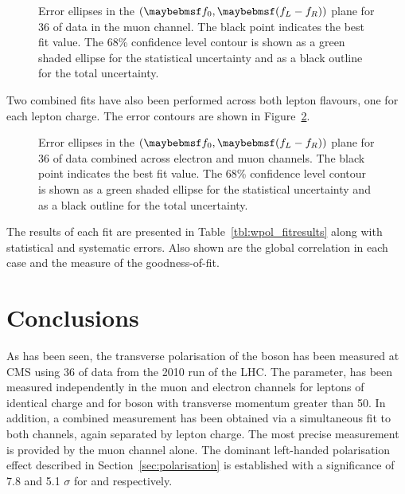 \begin{figure}
\centering
{}\quad
{}
\caption{Error ellipses in the $(\f0, \fLmfR)$ plane for \unit{36}{\invpb} of
  data in the muon channel. The black point indicates the best fit
  value. The 68\% confidence level contour is shown as a green shaded ellipse
  for the statistical uncertainty and as a black outline for the total
  uncertainty.}
\label{fig:wpol_contour_mu}
\end{figure}

Two combined fits have also been performed across both lepton flavours, one for
each lepton charge. The error contours are shown in
Figure~\ref{fig:wpol_contour_comb}.
\begin{figure}
\centering
{}\quad
{}
\caption{Error ellipses in the $(\f0, \fLmfR)$ plane for \unit{36}{\invpb} of
  data combined across electron and muon channels. The black point indicates the
  best fit value. The 68\% confidence level contour is shown as a green shaded
  ellipse for the statistical uncertainty and as a black outline for the total
  uncertainty.}
\label{fig:wpol_contour_comb}
\end{figure}

The results of each fit are presented in Table~\ref{tbl:wpol_fitresults} along
with statistical and systematic errors. Also shown are the global correlation in
each case and the \chisq measure of the goodness-of-fit.






\section{Conclusions}
As has been seen, the transverse polarisation of the \PW boson has been measured
at \ac{CMS} using \unit{36}{\invpb} of data from the 2010 run of the
\ac{LHC}. The parameter, \fLmfR has been measured independently in the muon and
electron channels for leptons of identical charge and for \PW boson with
transverse momentum greater than \unit{50}{\GeV}. In addition, a combined
measurement has been obtained via a simultaneous fit to both channels, again
separated by lepton charge. The most precise measurement is provided by the muon
channel alone. The dominant left-handed polarisation effect described in
Section~\ref{sec:polarisation} is established with a significance of 7.8 and 5.1
$\sigma$ for \PWp and \PWm respectively.

